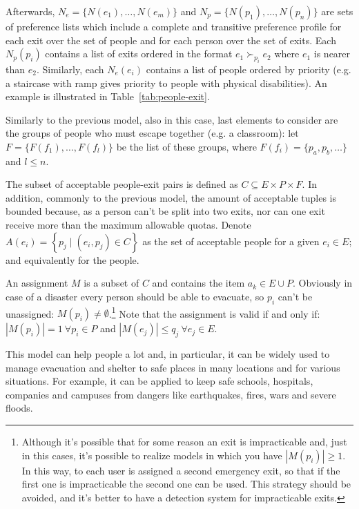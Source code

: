 Afterwards, \(N_e = \{N(e_1), \dots, N(e_m)\}\) and \(N_p = \{ N(p_1), \dots, N(p_n)\}\) are sets of preference lists which include a complete and transitive preference profile for each exit over the set of people and for each person over the set of exits. Each \(N_p(p_i)\) contains a list of exits ordered in the format \(e_1 \succ_{p_i} e_2\) where \(e_1\) is nearer than \(e_2\). Similarly, each \(N_e(e_i)\) contains a list of people ordered by priority (e.g. a staircase with ramp gives priority to people with physical disabilities). An example is illustrated in Table~\ref{tab:people-exit}.

Similarly to the previous model, also in this case, last elements to consider are the groups of people who must escape together (e.g. a classroom): let \(F=\{F(f_1), \dots, F(f_l)\}\) be the list of these groups, where \(F(f_i) = \{p_a, p_b, \dots\}\) and \(l\leq n\).

The subset of acceptable people-exit pairs is defined as \(C \subseteq E \times P \times F\). In addition, commonly to the previous model, the amount of acceptable tuples is bounded because, as a person can't be split into two exits, nor can one exit receive more than the maximum allowable quotas. Denote \( A \left( e_i \right) = \left\{ p_j \mid \left( e_i , p_j \right) \in C \right\} \) as the set of acceptable people for a given \( e_i \in E \); and equivalently for the people.

An assignment \(M\) is a subset of \(C\) and contains the item \( a_k \in E \cup P \). Obviously in case of a disaster every person should be able to evacuate, so  \( p_i\) can't be unassigned: \( M \left( p_i\right) \neq \emptyset \).\footnote{Although it's possible that for some reason an exit is impracticable and, just in this cases, it's possible to realize models in which you have \(|M \left( p_i \right)| \geq 1\). In this way, to each user is assigned a second emergency exit, so that if the first one is impracticable the second one can be used. This strategy should be avoided, and it's better to have a detection system for impracticable exits.}
Note that the assignment is valid if and only if: \(\left| M \left( p_i\right) \right| = 1 \ \forall p_i\in P\) and \(\left| M \left( e_j \right) \right| \leq q_j \ \forall e_j \in E\).

This model can help people a lot and, in particular, it can be widely used to manage evacuation and shelter to safe places in many locations and for various situations. For example, it can be applied to keep safe schools, hospitals, companies and campuses from dangers like earthquakes, fires, wars and severe floods.

